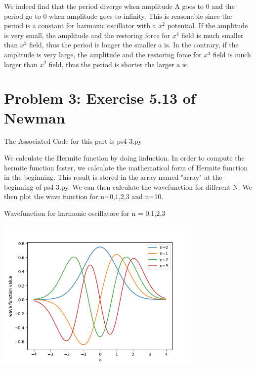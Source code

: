 \documentclass[letterpaper,12pt]{article}
\begin{document}
\newpage

We indeed find that the period diverge when amplitude A goes to 0 and the period go to 0 when amplitude goes to infinity. This is reasonable since the period is a constant for harmonic oscillator with a $x^2$ potential. If the amplitude is very small, the amplitude and the restoring force for $x^4$ field is much smaller than $x^2$ field, thus the period is longer the smaller a is. In the contrary, if the amplitude is very large, the amplitude and the restoring force for $x^4$ field is much larger than $x^2$ field, thus the period is shorter the larger a is.



\section{Problem 3: Exercise 5.13 of Newman}

The Associated Code for this part is ps4-3.py

We calculate the Hermite function by doing induction. In order to compute the hermite function faster, we calculate the mathematical form of Hermite function in the beginning. This result is stored in the array named "array" at the beginning of ps4-3.py. We can then calculate the wavefunction for different N. We then plot the wave function for n=0,1,2,3 and n=10.

\begin{table}[!h]
    \centering
    \caption{Wavefunction for harmonic oscillatore for n = 0,1,2,3}
    \includegraphics[width=10cm]{ps4-3-1.png}
    \label{plot}%
\end{table}%
\end{document}
